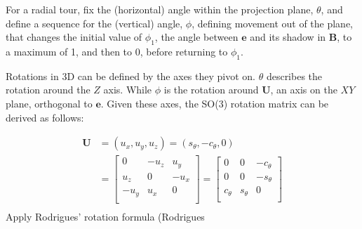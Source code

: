 For a radial tour, fix the (horizontal) angle within the projection
plane, \(\theta\), and define a sequence for the (vertical) angle,
\(\phi\), defining movement out of the plane, that changes the initial
value of \(\phi_1\), the angle between \(\textbf{e}\) and its shadow in
\(\textbf{B}\), to a maximum of 1, and then to 0, before returning to
\(\phi_1\).

Rotations in 3D can be defined by the axes they pivot on. \(\theta\)
describes the rotation around the \(Z\) axis. While \(\phi\) is the
rotation around \(\textbf{U}\), an axis on the \(XY\) plane, orthogonal
to \(\textbf{e}\). Given these axes, the SO(3) rotation matrix can be
derived as follows:

\begin{align*}
  \textbf{U} &= (u_x, u_y, u_z) =
  (s_\theta, -c_\theta, 0) \\ 
  &=
  \begin{bmatrix}
  0 & -u_z & u_y  \\
  u_z & 0 & -u_x \\
  -u_y & u_x & 0 \\
  \end{bmatrix} =
  \begin{bmatrix}
    0 & 0 & -c_\theta \\
    0 & 0 & -s_\theta \\
    c_\theta & s_\theta & 0 \\
  \end{bmatrix} \\
  \end{align*} Apply Rodrigues' rotation formula (Rodrigues
